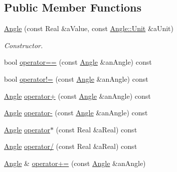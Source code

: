 \subsection*{Public Member Functions}
\begin{DoxyCompactItemize}
\item 
\hyperlink{classlibrary_1_1physics_1_1units_1_1_angle_a6cd94e306cdc3a15fe13135729299d99}{Angle} (const Real \&a\+Value, const \hyperlink{classlibrary_1_1physics_1_1units_1_1_angle_a3c329d415a61783b16ce481874cc5956}{Angle\+::\+Unit} \&a\+Unit)
\begin{DoxyCompactList}\small\item\em Constructor. \end{DoxyCompactList}\item 
bool \hyperlink{classlibrary_1_1physics_1_1units_1_1_angle_a7438eef61dd54f58c4270fae0d2ccb20}{operator==} (const \hyperlink{classlibrary_1_1physics_1_1units_1_1_angle}{Angle} \&an\+Angle) const
\item 
bool \hyperlink{classlibrary_1_1physics_1_1units_1_1_angle_ad25b468efa92e37f8d45d624a9ed6497}{operator!=} (const \hyperlink{classlibrary_1_1physics_1_1units_1_1_angle}{Angle} \&an\+Angle) const
\item 
\hyperlink{classlibrary_1_1physics_1_1units_1_1_angle}{Angle} \hyperlink{classlibrary_1_1physics_1_1units_1_1_angle_aebf6869b414e02af92a924d561822824}{operator+} (const \hyperlink{classlibrary_1_1physics_1_1units_1_1_angle}{Angle} \&an\+Angle) const
\item 
\hyperlink{classlibrary_1_1physics_1_1units_1_1_angle}{Angle} \hyperlink{classlibrary_1_1physics_1_1units_1_1_angle_a034a88587139bb8642e80f353ead5ce2}{operator-\/} (const \hyperlink{classlibrary_1_1physics_1_1units_1_1_angle}{Angle} \&an\+Angle) const
\item 
\hyperlink{classlibrary_1_1physics_1_1units_1_1_angle}{Angle} \hyperlink{classlibrary_1_1physics_1_1units_1_1_angle_a958b708b331ded088189882187a4de89}{operator$\ast$} (const Real \&a\+Real) const
\item 
\hyperlink{classlibrary_1_1physics_1_1units_1_1_angle}{Angle} \hyperlink{classlibrary_1_1physics_1_1units_1_1_angle_a4807751951c97b1de78e7b98b51abaed}{operator/} (const Real \&a\+Real) const
\item 
\hyperlink{classlibrary_1_1physics_1_1units_1_1_angle}{Angle} \& \hyperlink{classlibrary_1_1physics_1_1units_1_1_angle_a5f20b012cb332e631a6271144a0817a2}{operator+=} (const \hyperlink{classlibrary_1_1physics_1_1units_1_1_angle}{Angle} \&an\+Angle)

\end{DoxyCompactItemize}

